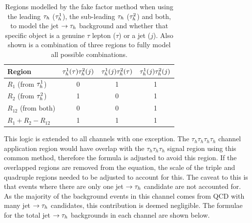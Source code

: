 \begin{table}[H]
\centering
\begin{tabular}{|l|ccc|}
\hline
Region    & $\tau_{h}^1 (\tau) \tau_{h}^2 (j)$ & $\tau_{h}^1 (j) \tau_{h}^2 (\tau)$ & $\tau_{h}^1 (j) \tau_{h}^2 (j)$ \\
\hline
\hline
$R_{1}$ (from $\tau_{h}^1$)     & 0                            & 1                            & 1                         \\
$R_{2}$ (from $\tau_{h}^2$)     & 1                            & 0                            & 1                         \\
$R_{12}$ (from both)         & 0                            & 0                            & 1                         \\
\hline
$R_{1} +R_{2} - R_{12}$      & 1                            & 1                            & 1       \\                  
\hline
\end{tabular}
\caption{Regions modelled by the fake factor method when using the leading $\tau_{h}$ ($\tau_{h}^1$), the sub-leading $\tau_{h}$ ($\tau_{h}^2$) and both, to model the jet $\rightarrow \tau_{h}$ background and whether that specific object is a genuine $\tau$ lepton ($\tau$) or a jet ($j$). Also shown is a combination of three regions to fully model all possible combinations. }
\label{tab:apply_ff}
\end{table}

This logic is extended to all channels with one exception.
The $\tau_h \tau_h \tau_h \tau_h$ channel application region would have overlap with the $\tau_h \tau_h \tau_h$ signal region using this common method, therefore the formula is adjusted to avoid this region.
If the overlapped regions are removed from the equation, the scale of the triple and quadruple regions needed to be adjusted to account for this.
The caveat to this is that events where there are only one jet $\rightarrow \tau_{h}$ candidate are not accounted for.
As the majority of the background events in this channel comes from \ac{QCD} with many jet $\rightarrow \tau_{h}$ candidates, this contribution is deemed negligible.
The formulae for the total jet $\rightarrow \tau_{h}$ backgrounds in each channel are shown below. \\

